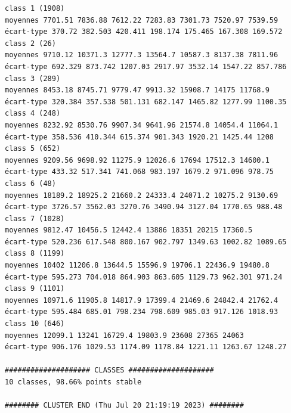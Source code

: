 \documentclass[land,article,submit,pdftex,moreauthors]{Definitions/mdpi}
\begin{document}
\begin{scriptsize}
\begin{verbatim}
class 1 (1908)
moyennes 7701.51 7836.88 7612.22 7283.83 7301.73 7520.97 7539.59
écart-type 370.72 382.503 420.411 198.174 175.465 167.308 169.572
class 2 (26)
moyennes 9710.12 10371.3 12777.3 13564.7 10587.3 8137.38 7811.96
écart-type 692.329 873.742 1207.03 2917.97 3532.14 1547.22 857.786
class 3 (289)
moyennes 8453.18 8745.71 9779.47 9913.32 15908.7 14175 11768.9
écart-type 320.384 357.538 501.131 682.147 1465.82 1277.99 1100.35
class 4 (248)
moyennes 8232.92 8530.76 9907.34 9641.96 21574.8 14054.4 11064.1
écart-type 358.536 410.344 615.374 901.343 1920.21 1425.44 1208
class 5 (652)
moyennes 9209.56 9698.92 11275.9 12026.6 17694 17512.3 14600.1
écart-type 433.32 517.341 741.068 983.197 1679.2 971.096 978.75
class 6 (48)
moyennes 18189.2 18925.2 21660.2 24333.4 24071.2 10275.2 9130.69
écart-type 3726.57 3562.03 3270.76 3490.94 3127.04 1770.65 988.48
class 7 (1028)
moyennes 9812.47 10456.5 12442.4 13886 18351 20215 17360.5
écart-type 520.236 617.548 800.167 902.797 1349.63 1002.82 1089.65
class 8 (1199)
moyennes 10402 11206.8 13644.5 15596.9 19706.1 22436.9 19480.8
écart-type 595.273 704.018 864.903 863.605 1129.73 962.301 971.24
class 9 (1101)
moyennes 10971.6 11905.8 14817.9 17399.4 21469.6 24842.4 21762.4
écart-type 595.484 685.01 798.234 798.609 985.03 917.126 1018.93
class 10 (646)
moyennes 12099.1 13241 16729.4 19803.9 23608 27365 24063
écart-type 906.176 1029.53 1174.09 1178.84 1221.11 1263.67 1248.27

#################### CLASSES ####################
10 classes, 98.66% points stable

######## CLUSTER END (Thu Jul 20 21:19:19 2023) ########
\end{verbatim}
\end{scriptsize}
\end{document}
